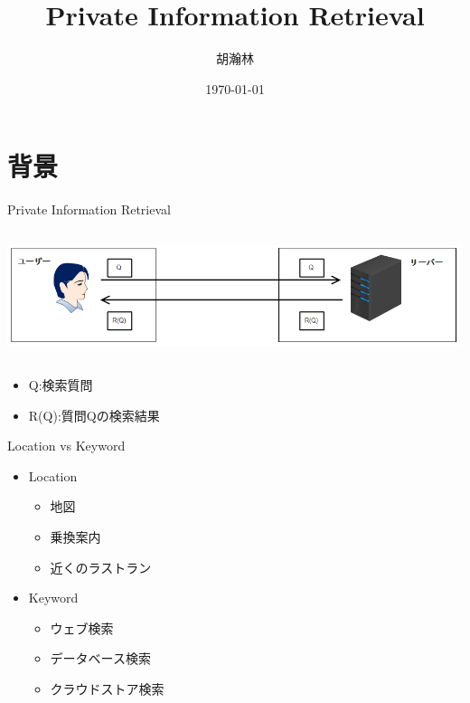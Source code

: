 \documentclass[14pt,xcolor=dvipsnames,table,dvipdfmx]{beamer}
\title{\bfseries Private Information Retrieval}
\author{胡瀚林}
\date{\today}
\begin{document}
\maketitle
\frame{\tableofcontents[hideallsubsections]}

\section{背景}
\begin{frame}{Private Information Retrieval}

\begin{columns}[t]
    \begin{column}{0.8\textwidth} %
      	\includegraphics[width=\columnwidth]{photo1.png}
    \end{column}
\end{columns}
	\begin{block}{}
	\begin{itemize}
    	\item Q:検索質問
		\item R(Q):質問Qの検索結果
	\end{itemize}
	\end{block}
\end{frame}

\begin{frame}{Location vs Keyword}
	\begin{block}{}
		\begin{itemize}
		\item Location
			\begin{itemize}
			\item 地図
			\item 乗換案内
			\item 近くのラストラン
			\end{itemize}
		\end{itemize}
        \begin{itemize}
        \item Keyword
            \begin{itemize}
            \item ウェブ検索
            \item データベース検索
            \item クラウドストア検索
            \end{itemize}
        \end{itemize}
	\end{block}
\end{frame}
\end{document}
